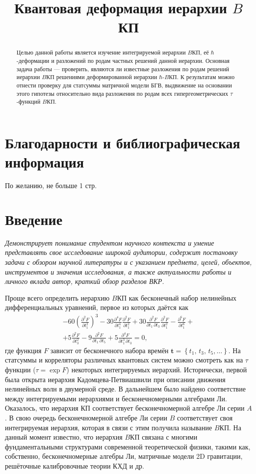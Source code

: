 \documentclass[a4paper,14pt]{extarticle}
\title{Квантовая деформация иерархии $B$КП}
\numberwithin{equation}{section}
\begin{document}
\maketitle
\begin{abstract}
Целью данной работы является изучение интегрируемой иерархии
$B$КП, её $\hbar $-деформации и разложений по родам частных
решений данной иерархии. Основная задача работы --- проверить,
являются ли известные разложения по родам решений иерархии $B$КП
решениями деформированной иерархии $\hbar $-$B$КП. К результатам можно отнести проверку для статсуммы матричной модели БГВ, выдвижение на основании этого гипотезы относительно вида разложения по родам
всех гипергеометрических $\tau$-функций $B$КП.
\end{abstract}
\section*{Благодарности и библиографическая информация}
По желанию, не больше 1 стр.
\tableofcontents
\section{Введение}
\emph{Демонстрирует понимание студентом научного контекста и умение
представлять свое исследование широкой аудитории, содержит постановку
задачи с обзором научной литературы и с указанием предмета, целей, объектов,
инструментов и значения исследования, а также актуальности работы и личного
вклада автор, краткий обзор разделов ВКР.}

Проще всего определить иерархию $B$КП как бесконечный
набор нелинейных дифференциальных уравнений, первое
из которых даётся как
\begin{multline}
-60 \left(\frac{\partial ^2F}{\partial
   t_1^2}\right)^3-30 \frac{\partial ^4F}{\partial
   t_1^4} \frac{\partial ^2F}{\partial
   t_1^2}+30 \frac{\partial ^2F}{\partial t_1\, \partial t_3}
   \frac{\partial ^2F}{\partial t_1^2}-\frac{\partial
   ^6F}{\partial t_1^6}+\\+5 \frac{\partial ^2F}{\partial
   t_3^2}-9 \frac{\partial ^2F}{\partial t_1\, \partial t_5}+5
   \frac{\partial ^4F}{\partial t_1^3\, \partial t_3}=0	
	\label{}
,\end{multline}
где функция $F$ зависит от бесконечного набора 
времён $\mathbf{t}= \left\{t_1,\,t_{3},\,t_5,\ldots \right\} $. На статсуммы и корреляторы различных квантовых систем можно смотреть как на
$\tau$ функции ($\tau=\exp F$) некоторых интегрируемых
иерархий. Исторически, первой была открыта иерархия Кадомцева-Петвиашвили при описании движения нелинейных волн в двумерной
среде. В дальнейшем было найдено соответствие
между интегрируемыми иерархиями и бесконечномерными алгебрами Ли. Оказалось, что иерархия КП соответствует
бесконечномерной алгебре Ли серии $A$. В свою очередь бесконечномерной алгебре Ли серии $B$ соответствует своя
интегрируемая иерархия, которая в связи с этим получила
называние $B$КП. На данный момент известно, что иерархия
$B$КП связана с многими фундаментальными структурами
современной теоретической физики, такими как, собственно,
бесконечномерные алгебры Ли, матричные модели 2D гравитации,
решёточные калибровочные теории КХД и др.
\end{document}
